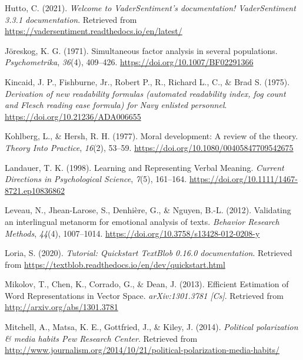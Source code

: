 \documentclass[
  man,floatsintext]{apa6}
\newlength{\cslhangindent}
\newenvironment{CSLReferences}[2] %
 {\begin{list}{}{%
  \setlength{\itemindent}{0pt}
  \setlength{\leftmargin}{0pt}
  \setlength{\parsep}{0pt}
  \ifodd #1
   \setlength{\leftmargin}{\cslhangindent}
   \setlength{\itemindent}{-1\cslhangindent}
  \fi
  \setlength{\itemsep}{#2\baselineskip}}}
 {\end{list}}
\begin{document}
\begin{CSLReferences}{1}{0}
Hutto, C. (2021). \emph{Welcome to VaderSentiment{'}s documentation! {\textemdash} VaderSentiment 3.3.1 documentation}. Retrieved from \url{https://vadersentiment.readthedocs.io/en/latest/}

Jöreskog, K. G. (1971). Simultaneous factor analysis in several populations. \emph{Psychometrika}, \emph{36}(4), 409--426. \url{https://doi.org/10.1007/BF02291366}

Kincaid, J. P., Fishburne, Jr., Robert P., R., Richard L., C., \& Brad S. (1975). \emph{Derivation of new readability formulas (automated readability index, fog count and {F}lesch reading ease formula) for {N}avy enlisted personnel}. \url{https://doi.org/10.21236/ADA006655}

Kohlberg, L., \& Hersh, R. H. (1977). {Moral development: A review of the theory}. \emph{Theory Into Practice}, \emph{16}(2), 53--59. \url{https://doi.org/10.1080/00405847709542675}

Landauer, T. K. (1998). {Learning and Representing Verbal Meaning}. \emph{Current Directions in Psychological Science}, \emph{7}(5), 161--164. \url{https://doi.org/10.1111/1467-8721.ep10836862}

Leveau, N., Jhean-Larose, S., Denhière, G., \& Nguyen, B.-L. (2012). Validating an interlingual metanorm for emotional analysis of texts. \emph{Behavior Research Methods}, \emph{44}(4), 1007--1014. \url{https://doi.org/10.3758/s13428-012-0208-y}

Loria, S. (2020). \emph{Tutorial: Quickstart {\textemdash} TextBlob 0.16.0 documentation}. Retrieved from \url{https://textblob.readthedocs.io/en/dev/quickstart.html}

Mikolov, T., Chen, K., Corrado, G., \& Dean, J. (2013). Efficient {Estimation} of {Word} {Representations} in {Vector} {Space}. \emph{arXiv:1301.3781 {[}Cs{]}}. Retrieved from \url{http://arxiv.org/abs/1301.3781}

Mitchell, A., Matsa, K. E., Gottfried, J., \& Kiley, J. (2014). \emph{{Political polarization {\&} media habits \textbar{} Pew Research Center}}. Retrieved from \url{http://www.journalism.org/2014/10/21/political-polarization-media-habits/}


\end{CSLReferences}
\end{document}
